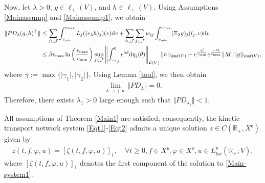 \documentclass[onecolumn]{autart}
\def\R{{\mathbb{R}}}
\def\la{\lambda}
\def\calL{{\mathcal{L}}}
\def\R{\mathbb R}
\numberwithin{equation}{section}
\begin{document}
		Now, let $\lambda > 0$, $g\in \bm{\ell}_+(V)$, and  $h\in {\bm{\ell}_+}(V)$. Using Assumptions \ref{Mainassump} and \ref{Mainassump1}, we obtain
	  \begin{align*}
				\Vert PD_\la(g, h)^{\top}\Vert
				&\le\sum_{j\in \mathcal{J}}\int_{v_{\min}}^{v_{\max}}{L}_{j}((e_\lambda h)_j)(v)\text{d} v
				+ \sum_{i\in \mathcal{J}}\sum_{j\in \mathcal{J}}w_{ij}\displaystyle\int_{v_{\min}}^{v_{\max}} (\Xi_\lambda g)_j(l_j,v) \text{d}v\\
				&\le  \bar{\beta}v_{\max}\ln\left(\frac{v_{\max}}{v_{\min}}\right)\sup_{j\in \mathcal{J}} \left\Vert \int_{-r_j}^{0} e^{\la \theta}{\rm d}\eta_j(\theta)\right\Vert_{\calL(V)} \Vert h\Vert_{{\bm \ell}(V)}
				+  e^{\frac{\bar{\gamma} \bar{l}}{v_{\min}}}e^{\frac{-\la \underline{l} }{v_{\max}}} \Vert M \Vert  \Vert g\Vert_{{\bm \ell}(V)},
		\end{align*}
		where $\bar{\gamma}:=\max\{\vert\gamma_1\vert,\vert\gamma_2\vert\}$. Using Lemma \ref{tool}, we then obtain
		\begin{align*}
			\lim_{\la \to +\infty} \Vert P D_\la\Vert =0.
		\end{align*}
		Therefore, there exists $\lambda_1 > 0$ large enough such that $\Vert P D_{\lambda_1} \Vert <1$.
		
		All assumptions of Theorem \ref{Main1} are satisfied; consequently, the kinetic transport network system \eqref{Eqt1}-\eqref{Eqt2} admits a unique solution $z \in {C}(\R_+, X^{\mathsf{e}})$ given by
		\begin{align}\label{Explicit}
			z(t,f,\varphi,u)=\left[\zeta(t,f,\varphi,u)\right]_1,\quad \forall  t \ge 0,f \in X^{\mathsf{e}},\varphi \in X^{o},u \in L^p_{loc}(\R_+; V),
		\end{align}
		where $\left[\zeta(t, f, \varphi, u)\right]_1$ denotes the first component of the solution to \eqref{Main-system1}.
		
\end{document}
